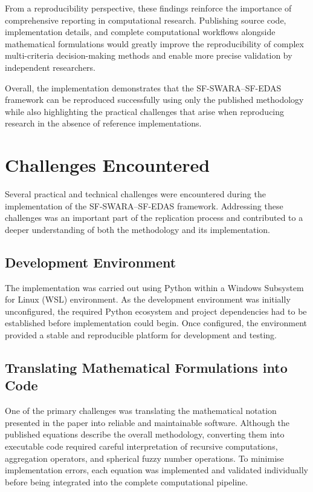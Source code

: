 \documentclass[11pt]{article}
\begin{document}
From a reproducibility perspective, these findings reinforce the importance of comprehensive reporting in computational research. Publishing source code, implementation details, and complete computational workflows alongside mathematical formulations would greatly improve the reproducibility of complex multi-criteria decision-making methods and enable more precise validation by independent researchers.

Overall, the implementation demonstrates that the SF-SWARA--SF-EDAS framework can be reproduced successfully using only the published methodology while also highlighting the practical challenges that arise when reproducing research in the absence of reference implementations.

\section{Challenges Encountered}
Several practical and technical challenges were encountered during the implementation of the SF-SWARA--SF-EDAS framework. Addressing these challenges was an important part of the replication process and contributed to a deeper understanding of both the methodology and its implementation.

\subsection{Development Environment}
The implementation was carried out using Python within a Windows Subsystem for Linux (WSL) environment. As the development environment was initially unconfigured, the required Python ecosystem and project dependencies had to be established before implementation could begin. Once configured, the environment provided a stable and reproducible platform for development and testing.

\subsection{Translating Mathematical Formulations into Code}
One of the primary challenges was translating the mathematical notation presented in the paper into reliable and maintainable software. Although the published equations describe the overall methodology, converting them into executable code required careful interpretation of recursive computations, aggregation operators, and spherical fuzzy number operations. To minimise implementation errors, each equation was implemented and validated individually before being integrated into the complete computational pipeline.
\end{document}
